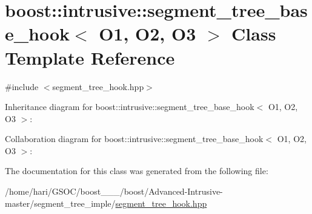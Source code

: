 \hypertarget{classboost_1_1intrusive_1_1segment__tree__base__hook}{}\section{boost\+:\+:intrusive\+:\+:segment\+\_\+tree\+\_\+base\+\_\+hook$<$ O1, O2, O3 $>$ Class Template Reference}
\label{classboost_1_1intrusive_1_1segment__tree__base__hook}


{\ttfamily \#include $<$segment\+\_\+tree\+\_\+hook.\+hpp$>$}



Inheritance diagram for boost\+:\+:intrusive\+:\+:segment\+\_\+tree\+\_\+base\+\_\+hook$<$ O1, O2, O3 $>$\+:


Collaboration diagram for boost\+:\+:intrusive\+:\+:segment\+\_\+tree\+\_\+base\+\_\+hook$<$ O1, O2, O3 $>$\+:


The documentation for this class was generated from the following file\+:\begin{DoxyCompactItemize}
\item 
/home/hari/\+G\+S\+O\+C/boost\+\_\+\_\+\_/boost/\+Advanced-\/\+Intrusive-\/master/segment\+\_\+tree\+\_\+imple/\hyperlink{segment__tree__hook_8hpp}{segment\+\_\+tree\+\_\+hook.\+hpp}\end{DoxyCompactItemize}
